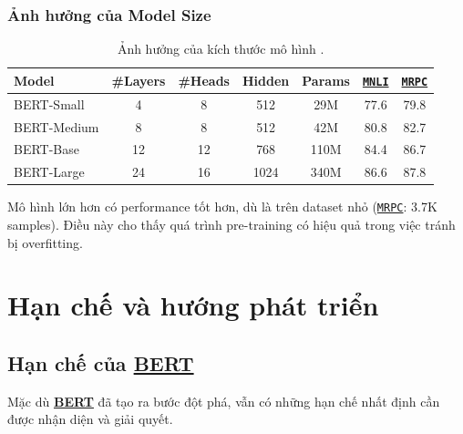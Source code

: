 \subsubsection{Ảnh hưởng của Model Size}
\begin{table}[H]
    \centering
    \caption{Ảnh hưởng của kích thước mô hình \cite{devlin2018bert}.}
    \label{tab:model_size_effect}
    \begin{tabular}{lcccccc}
        \toprule
        \textbf{Model} & \textbf{\#Layers} & \textbf{\#Heads} & \textbf{Hidden} & \textbf{Params} & \textbf{\hyperref[acro:mnli]{\texttt{MNLI}}} & \textbf{\hyperref[acro:mrpc]{\texttt{MRPC}}} \\
        \midrule
        BERT-Small & 4 & 8 & 512 & 29M & 77.6 & 79.8 \\
        BERT-Medium & 8 & 8 & 512 & 42M & 80.8 & 82.7 \\
        BERT-Base & 12 & 12 & 768 & 110M & 84.4 & 86.7 \\
        BERT-Large & 24 & 16 & 1024 & 340M & 86.6 & 87.8 \\
        \bottomrule
    \end{tabular}
\end{table}

Mô hình lớn hơn có performance tốt hơn, dù là trên dataset nhỏ (\hyperref[acro:mrpc]{\texttt{MRPC}}: 3.7K samples). Điều này cho thấy quá trình pre-training có hiệu quả trong việc tránh bị overfitting.

\section{Hạn chế và hướng phát triển}
\label{sec:han_che_huong_phat_trien}

\subsection{Hạn chế của \hyperref[acro:bert]{\textbf{BERT}}}
\label{ssec:han_che_bert}

Mặc dù \hyperref[acro:bert]{\textbf{BERT}} đã tạo ra bước đột phá, vẫn có những hạn chế nhất định cần được nhận diện và giải quyết.

